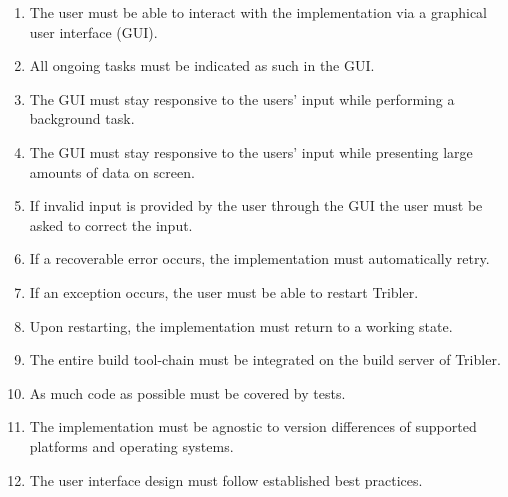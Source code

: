 \begin{enumerate}[label=B\arabic*.,ref=B\arabic*]
	\item \label{rq:Gui} The user must be able to interact with the implementation via a graphical user interface (GUI).
	\item \label{rq:Progressbar} All ongoing tasks must be indicated as such in the GUI.
	\item \label{rq:Responsive} The GUI must stay responsive to the users' input while performing a background task.
	\item \label{rq:ResponsiveList} The GUI must stay responsive to the users' input while presenting large amounts of data on screen.
	\item \label{rq:UserRetry} If invalid input is provided by the user through the GUI the user must be asked to correct the input.
	\item \label{rq:AutoRetry} If a recoverable error occurs, the implementation must automatically retry.
	\item \label{rq:Restart} If an exception occurs, the user must be able to restart Tribler.
	\item \label{rq:Recover} Upon restarting, the implementation must return to a working state.
	\item \label{rq:CI} The entire build tool-chain must be integrated on the build server of Tribler. %
	\item \label{rq:Coverage} As much code as possible must be covered by tests.
	\item \label{rq:SupportLibs} The implementation must be agnostic to version differences of supported platforms and operating systems.
	\item \label{rq:MaterialDesign} The user interface design must follow established best practices.%

\end{enumerate}
